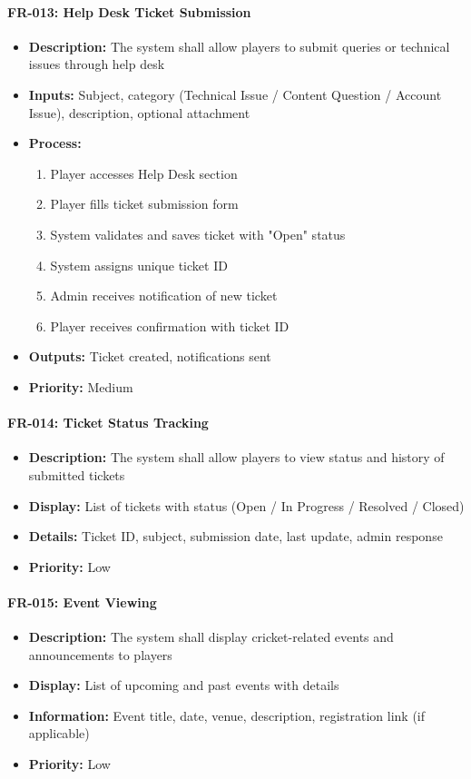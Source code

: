 \documentclass[12pt,a4paper]{article}
\begin{document}
\begin{enumerate}
\paragraph{FR-013: Help Desk Ticket Submission}
\begin{itemize}
    \item \textbf{Description:} The system shall allow players to submit queries or technical issues through help desk
    \item \textbf{Inputs:} Subject, category (Technical Issue / Content Question / Account Issue), description, optional attachment
    \item \textbf{Process:}
    \begin{enumerate}
        \item Player accesses Help Desk section
        \item Player fills ticket submission form
        \item System validates and saves ticket with "Open" status
        \item System assigns unique ticket ID
        \item Admin receives notification of new ticket
        \item Player receives confirmation with ticket ID
    \end{enumerate}
    \item \textbf{Outputs:} Ticket created, notifications sent
    \item \textbf{Priority:} Medium
\end{itemize}

\paragraph{FR-014: Ticket Status Tracking}
\begin{itemize}
    \item \textbf{Description:} The system shall allow players to view status and history of submitted tickets
    \item \textbf{Display:} List of tickets with status (Open / In Progress / Resolved / Closed)
    \item \textbf{Details:} Ticket ID, subject, submission date, last update, admin response
    \item \textbf{Priority:} Low
\end{itemize}

\paragraph{FR-015: Event Viewing}
\begin{itemize}
    \item \textbf{Description:} The system shall display cricket-related events and announcements to players
    \item \textbf{Display:} List of upcoming and past events with details
    \item \textbf{Information:} Event title, date, venue, description, registration link (if applicable)
    \item \textbf{Priority:} Low
\end{itemize}


\end{enumerate}
\end{document}
